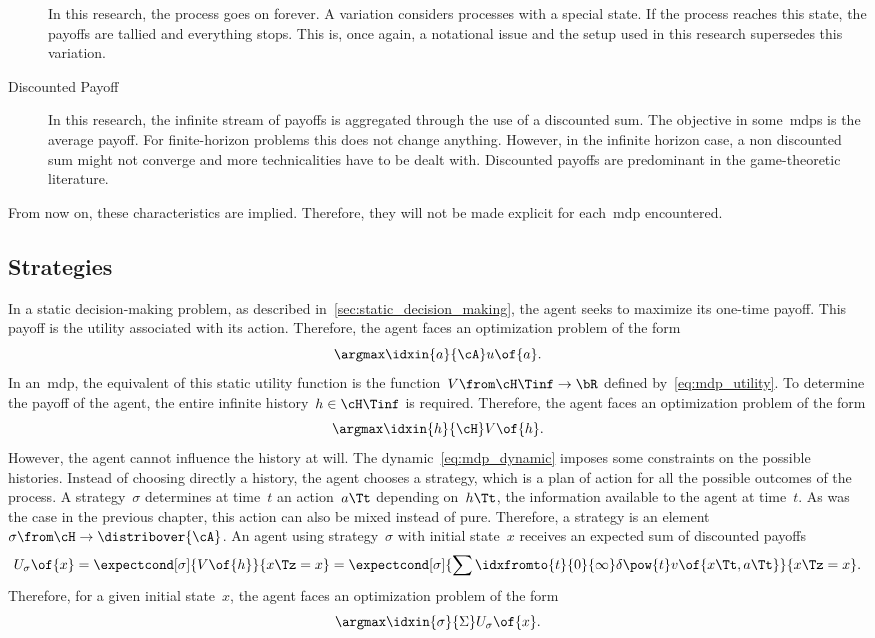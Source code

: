 \begin{note}
\begin{description}
In this research, the process goes on forever.
A variation considers processes with a special state.
If the process reaches this state, the payoffs are tallied and everything stops.
This is, once again, a notational issue and the setup used in this research supersedes this variation.
\item[Discounted Payoff]
In this research, the infinite stream of payoffs is aggregated through the use of a discounted sum.
The objective in some~\acp{mdp} is the average payoff.
For finite-horizon problems this does not change anything.
However, in the infinite horizon case, a non discounted sum might not converge and more technicalities have to be dealt with.
Discounted payoffs are predominant in the game-theoretic literature.
\end{description}

From now on, these characteristics are implied.
Therefore, they will not be made explicit for each~\ac{mdp} encountered.
\end{note}

\subsection{Strategies}

In a static decision-making problem, as described in~\cref{sec:static_decision_making}, the agent seeks to maximize its one-time payoff.
This payoff is the utility associated with its action.
Therefore, the agent faces an optimization problem of the form
\[
\argmax\idxin{a}{\cA} u \of{a}.
\]
In an~\ac{mdp}, the equivalent of this static utility function is the function~\(V \from \cH\Tinf \to \bR\) defined by~\cref{eq:mdp_utility}.
To determine the payoff of the agent, the entire infinite history~\(h \in \cH\Tinf\) is required.
Therefore, the agent faces an optimization problem of the form
\[
\argmax\idxin{h}{\cH} V \of{h}.
\]
However, the agent cannot influence the history at will.
The dynamic~\cref{eq:mdp_dynamic} imposes some constraints on the possible histories.
Instead of choosing directly a history, the agent chooses a strategy, which is a plan of action for all the possible outcomes of the process.
A strategy~\(\sigma\) determines at time~\(t\) an action~\(a\Tt\) depending on~\(h\Tt\), the information available to the agent at time~\(t\).
As was the case in the previous chapter, this action can also be mixed instead of pure.
Therefore, a strategy is an element~\(\sigma \from \cH \to \distribover{\cA}\).
An agent using strategy~\(\sigma\) with initial state~\(x\) receives an expected sum of discounted payoffs
\begin{equation}
\label{eq:mdp_optimal_strategy}
U\strat{\sigma} \of {x}
=
\expectcond[\sigma] {V \of {h}}{x\Tz = x}
=
\expectcond[\sigma] {\sum \idxfromto{t}{0}{\infty} \delta \pow {t} v \of {x\Tt, a\Tt}} {x\Tz = x}.
\end{equation}
Therefore, for a given initial state~\(x\), the agent faces an optimization problem of the form
\[
\argmax\idxin{\sigma}{\Sigma} U\strat{\sigma} \of{x}.
\]

